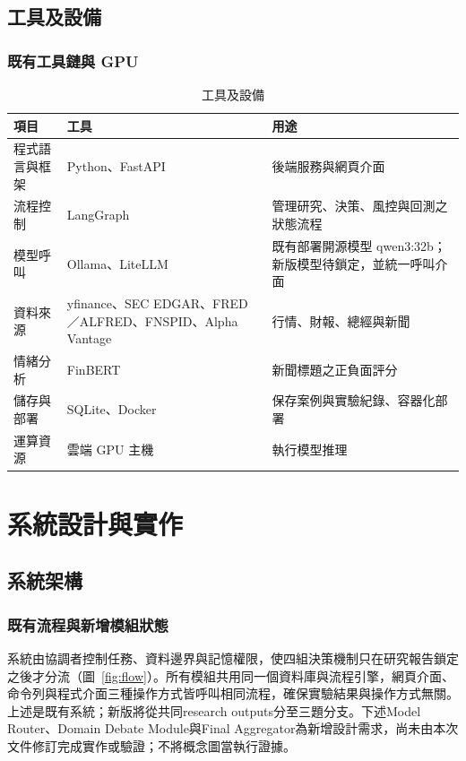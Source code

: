 \documentclass[12pt,a4paper]{article}
\begin{document}
\begin{CJK}{UTF8}{bkai}
\subsection{工具及設備}

\subsubsection{既有工具鏈與 GPU}
\begin{table}[H]
\centering\small
\caption{工具及設備}
\label{tab:tools}
\begin{tabularx}{\textwidth}{@{}l Y Y@{}}
\toprule
項目 & 工具 & 用途 \\
\midrule
程式語言與框架 & Python、FastAPI & 後端服務與網頁介面 \\
流程控制 & LangGraph & 管理研究、決策、風控與回測之狀態流程 \\
模型呼叫 & Ollama、LiteLLM & 既有部署開源模型 qwen3:32b；新版模型待鎖定，並統一呼叫介面 \\
資料來源 & yfinance、\allowbreak SEC EDGAR、\allowbreak FRED／ALFRED、\allowbreak FNSPID、\allowbreak Alpha Vantage &行情、財報、總經與新聞 \\
情緒分析 & FinBERT & 新聞標題之正負面評分 \\
儲存與部署 & SQLite、Docker & 保存案例與實驗紀錄、容器化部署 \\
運算資源 & 雲端 GPU 主機 & 執行模型推理 \\
\bottomrule
\end{tabularx}
\end{table}
\section{系統設計與實作}

\subsection{系統架構}

\subsubsection{既有流程與新增模組狀態}
系統由協調者控制任務、資料邊界與記憶權限，使四組決策機制只在研究報告鎖定之後才分流（圖~\ref{fig:flow}）。所有模組共用同一個資料庫與流程引擎，網頁介面、命令列與程式介面三種操作方式皆呼叫相同流程，確保實驗結果與操作方式無關。
上述是既有系統；新版將從共同research outputs分至三題分支。下述Model Router、Domain Debate Module與Final Aggregator為新增設計需求，尚未由本次文件修訂完成實作或驗證；不將概念圖當執行證據。


\end{CJK}
\end{document}
